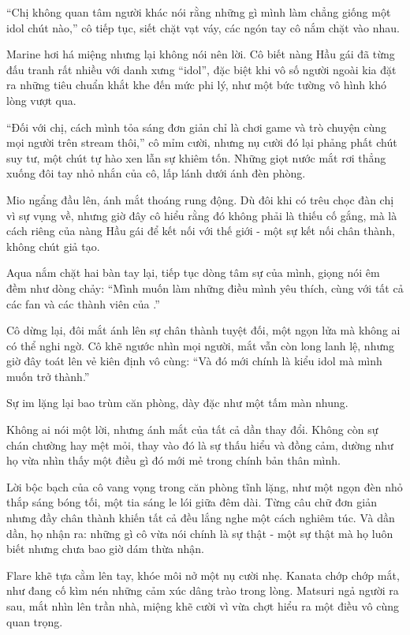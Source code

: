 \documentclass[../main.tex]{subfiles}
\begin{document}
``Chị không quan tâm người khác nói rằng những gì mình làm chẳng giống một idol chút nào,'' cô tiếp tục, siết chặt vạt váy, các ngón tay cô nắm chặt vào nhau.

Marine hơi há miệng nhưng lại không nói nên lời. Cô biết nàng Hầu gái đã từng đấu tranh rất nhiều với danh xưng ``idol'', đặc biệt khi vô số người ngoài kia đặt ra những tiêu chuẩn khắt khe đến mức phi lý, như một bức tường vô hình khó lòng vượt qua.

``Đối với chị, cách mình tỏa sáng đơn giản chỉ là chơi game và trò chuyện cùng mọi người trên stream thôi,'' cô mỉm cười, nhưng nụ cười đó lại phảng phất chút suy tư, một chút tự hào xen lẫn sự khiêm tốn. Những giọt nước mắt rơi thẳng xuống đôi tay nhỏ nhắn của cô, lấp lánh dưới ánh đèn phòng.

Mio ngẩng đầu lên, ánh mắt thoáng rung động. Dù đôi khi có trêu chọc đàn chị vì sự vụng về, nhưng giờ đây cô hiểu rằng đó không phải là thiếu cố gắng, mà là cách riêng của nàng Hầu gái để kết nối với thế giới - một sự kết nối chân thành, không chút giả tạo.

Aqua nắm chặt hai bàn tay lại, tiếp tục dòng tâm sự của mình, giọng nói êm đềm như dòng chảy: ``Mình muốn làm những điều mình yêu thích, cùng với tất cả các fan và các thành viên của \hll.''

Cô dừng lại, đôi mắt ánh lên sự chân thành tuyệt đối, một ngọn lửa mà không ai có thể nghi ngờ. Cô khẽ ngước nhìn mọi người, mắt vẫn còn long lanh lệ, nhưng giờ đây toát lên vẻ kiên định vô cùng: ``Và đó mới chính là kiểu idol mà mình muốn trở thành.''

Sự im lặng lại bao trùm căn phòng, dày đặc như một tấm màn nhung.

Không ai nói một lời, nhưng ánh mắt của tất cả dần thay đổi. Không còn sự chán chường hay mệt mỏi, thay vào đó là sự thấu hiểu và đồng cảm, dường như họ vừa nhìn thấy một điều gì đó mới mẻ trong chính bản thân mình.

Lời bộc bạch của cô vang vọng trong căn phòng tĩnh lặng, như một ngọn đèn nhỏ thắp sáng bóng tối, một tia sáng le lói giữa đêm dài. Từng câu chữ đơn giản nhưng đầy chân thành khiến tất cả đều lắng nghe một cách nghiêm túc. Và dần dần, họ nhận ra: những gì cô vừa nói chính là sự thật - một sự thật mà họ luôn biết nhưng chưa bao giờ dám thừa nhận.

Flare khẽ tựa cằm lên tay, khóe môi nở một nụ cười nhẹ. Kanata chớp chớp mắt, như đang cố kìm nén những cảm xúc dâng trào trong lòng. Matsuri ngả người ra sau, mắt nhìn lên trần nhà, miệng khẽ cười vì vừa chợt hiểu ra một điều vô cùng quan trọng.
\end{document}
